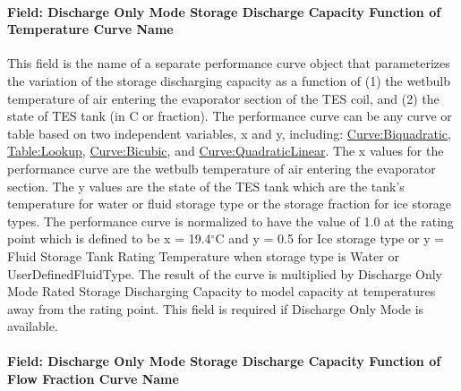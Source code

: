 \paragraph{Field: Discharge Only Mode Storage Discharge Capacity Function of Temperature Curve Name}\label{field-discharge-only-mode-storage-discharge-capacity-function-of-temperature-curve-name}

This field is the name of a separate performance curve object that parameterizes the variation of the storage discharging capacity as a function of (1) the wetbulb temperature of air entering the evaporator section of the TES coil, and (2) the state of TES tank (in C or fraction). The performance curve can be any curve or table based on two independent variables, x and y, including: \hyperref[curvebiquadratic]{Curve:Biquadratic}, \hyperref[tablelookup]{Table:Lookup}, \hyperref[curvebicubic]{Curve:Bicubic}, and \hyperref[curvequadraticlinear]{Curve:QuadraticLinear}. The x values for the performance curve are the wetbulb temperature of air entering the evaporator section. The y values are the state of the TES tank which are the tank's temperature for water or fluid storage type or the storage fraction for ice storage types. The performance curve is normalized to have the value of 1.0 at the rating point which is defined to be x = 19.4$^\circ$C and y = 0.5 for Ice storage type or y = Fluid Storage Tank Rating Temperature when storage type is Water or UserDefinedFluidType. The result of the curve is multiplied by Discharge Only Mode Rated Storage Discharging Capacity to model capacity at temperatures away from the rating point. This field is required if Discharge Only Mode is available.

\paragraph{Field: Discharge Only Mode Storage Discharge Capacity Function of Flow Fraction Curve Name}\label{field-discharge-only-mode-storage-discharge-capacity-function-of-flow-fraction-curve-name}

